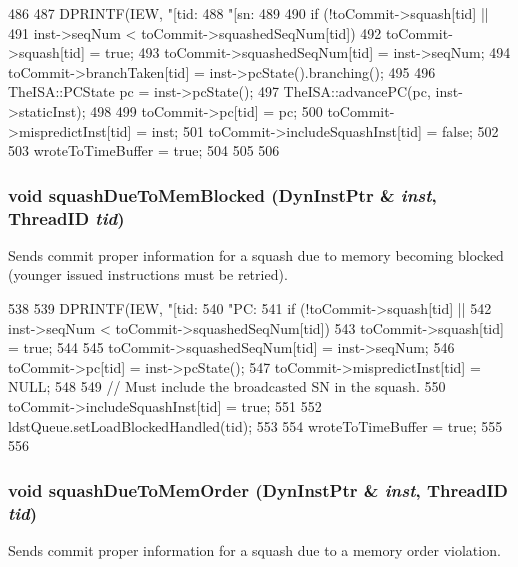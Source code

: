 \begin{DoxyCode}
486 {
487     DPRINTF(IEW, "[tid:%
488             "[sn:%
489 
490     if (!toCommit->squash[tid] ||
491             inst->seqNum < toCommit->squashedSeqNum[tid]) {
492         toCommit->squash[tid] = true;
493         toCommit->squashedSeqNum[tid] = inst->seqNum;
494         toCommit->branchTaken[tid] = inst->pcState().branching();
495 
496         TheISA::PCState pc = inst->pcState();
497         TheISA::advancePC(pc, inst->staticInst);
498 
499         toCommit->pc[tid] = pc;
500         toCommit->mispredictInst[tid] = inst;
501         toCommit->includeSquashInst[tid] = false;
502 
503         wroteToTimeBuffer = true;
504     }
505 
506 }
\end{DoxyCode}
\hypertarget{classDefaultIEW_aa471ebd447a37d3bf56e80c6ce0373f5}{
\subsubsection[{squashDueToMemBlocked}]{\setlength{\rightskip}{0pt plus 5cm}void squashDueToMemBlocked ({\bf DynInstPtr} \& {\em inst}, \/  {\bf ThreadID} {\em tid})}}
\label{classDefaultIEW_aa471ebd447a37d3bf56e80c6ce0373f5}
Sends commit proper information for a squash due to memory becoming blocked (younger issued instructions must be retried). 


\begin{DoxyCode}
538 {
539     DPRINTF(IEW, "[tid:%
540             "PC: %
541     if (!toCommit->squash[tid] ||
542             inst->seqNum < toCommit->squashedSeqNum[tid]) {
543         toCommit->squash[tid] = true;
544 
545         toCommit->squashedSeqNum[tid] = inst->seqNum;
546         toCommit->pc[tid] = inst->pcState();
547         toCommit->mispredictInst[tid] = NULL;
548 
549         // Must include the broadcasted SN in the squash.
550         toCommit->includeSquashInst[tid] = true;
551 
552         ldstQueue.setLoadBlockedHandled(tid);
553 
554         wroteToTimeBuffer = true;
555     }
556 }
\end{DoxyCode}
\hypertarget{classDefaultIEW_a581b3c0199d9fc6283bdc7dbcab26e45}{
\subsubsection[{squashDueToMemOrder}]{\setlength{\rightskip}{0pt plus 5cm}void squashDueToMemOrder ({\bf DynInstPtr} \& {\em inst}, \/  {\bf ThreadID} {\em tid})}}
\label{classDefaultIEW_a581b3c0199d9fc6283bdc7dbcab26e45}
Sends commit proper information for a squash due to a memory order violation. 



